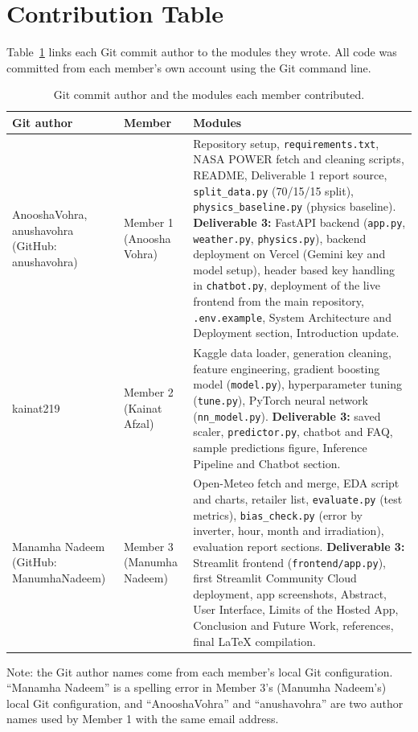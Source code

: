 \section{Contribution Table}
Table~\ref{tab:contributions} links each Git commit author to the modules
they wrote. All code was committed from each member's own account using the
Git command line.

\begin{table}[H]
\centering
\small
\caption{Git commit author and the modules each member contributed.}
\label{tab:contributions}
\begin{tabular}{p{3.0cm}p{2.6cm}p{9.0cm}}
\toprule
Git author & Member & Modules \\
\midrule
AnooshaVohra, anushavohra (GitHub: anushavohra) &
Member 1 (Anoosha Vohra) &
Repository setup, \texttt{requirements.txt}, NASA POWER fetch and cleaning
scripts, README, Deliverable 1 report source, \texttt{split\_data.py}
(70/15/15 split), \texttt{physics\_baseline.py} (physics baseline).
\textbf{Deliverable 3:} FastAPI backend (\texttt{app.py},
\texttt{weather.py}, \texttt{physics.py}), backend deployment on Vercel
(Gemini key and model setup), header based key handling in
\texttt{chatbot.py}, deployment of the live frontend from the main
repository, \texttt{.env.example}, System Architecture and Deployment
section, Introduction update. \\
\addlinespace
kainat219 &
Member 2 (Kainat Afzal) &
Kaggle data loader, generation cleaning, feature engineering, gradient
boosting model (\texttt{model.py}), hyperparameter tuning
(\texttt{tune.py}), PyTorch neural network (\texttt{nn\_model.py}).
\textbf{Deliverable 3:} saved scaler, \texttt{predictor.py}, chatbot and FAQ,
sample predictions figure, Inference Pipeline and Chatbot section. \\
\addlinespace
Manamha Nadeem (GitHub: ManumhaNadeem) &
Member 3 (Manumha Nadeem) &
Open-Meteo fetch and merge, EDA script and charts, retailer list,
\texttt{evaluate.py} (test metrics), \texttt{bias\_check.py} (error by
inverter, hour, month and irradiation), evaluation report sections.
\textbf{Deliverable 3:} Streamlit frontend (\texttt{frontend/app.py}),
first Streamlit Community Cloud deployment, app screenshots,
Abstract, User Interface, Limits of the Hosted App, Conclusion and Future
Work, references, final LaTeX compilation. \\
\bottomrule
\end{tabular}
\end{table}

Note: the Git author names come from each member's local Git configuration.
``Manamha Nadeem'' is a spelling error in Member 3's (Manumha Nadeem's) local
Git configuration, and ``AnooshaVohra'' and ``anushavohra'' are two author
names used by Member 1 with the same email address.